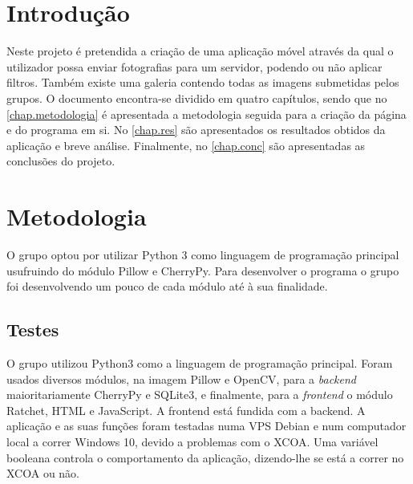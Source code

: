 \documentclass{report}
\begin{document}

\tableofcontents


%
\clearpage
{} %
%
\chapter{Introdução}
\label{chap.introducao} 

Neste projeto é pretendida a criação de uma aplicação móvel através da qual o utilizador possa enviar fotografias para um servidor, podendo ou não aplicar filtros. Também existe uma galeria contendo todas as imagens submetidas pelos grupos.
O documento encontra-se dividido em quatro capítulos,
sendo que no \autoref{chap.metodologia} é apresentada a metodologia seguida para a criação da página e do programa em si.
No \autoref{chap.res} são apresentados os resultados obtidos da aplicação e breve análise.
Finalmente, no \autoref{chap.conc} são apresentadas
as conclusões do projeto.


\chapter{Metodologia}
\label{chap.metodologia}

O grupo optou por utilizar Python 3 como linguagem de programação principal usufruindo do módulo Pillow e CherryPy. Para desenvolver o programa o grupo foi desenvolvendo um pouco de cada módulo até à sua finalidade.

\section{Testes}

O grupo utilizou Python3 como a linguagem de programação principal. Foram usados diversos módulos, na imagem Pillow e OpenCV, para a \textit{backend} maioritariamente CherryPy e SQLite3, e finalmente, para a \textit{frontend} o módulo Ratchet, HTML e JavaScript.
A frontend está fundida com a backend.
A aplicação e as suas funções foram testadas numa VPS Debian e num computador local a correr Windows 10, devido a problemas com o XCOA. Uma variável booleana controla o comportamento da aplicação, dizendo-lhe se está a correr no XCOA ou não.
\end{document}
